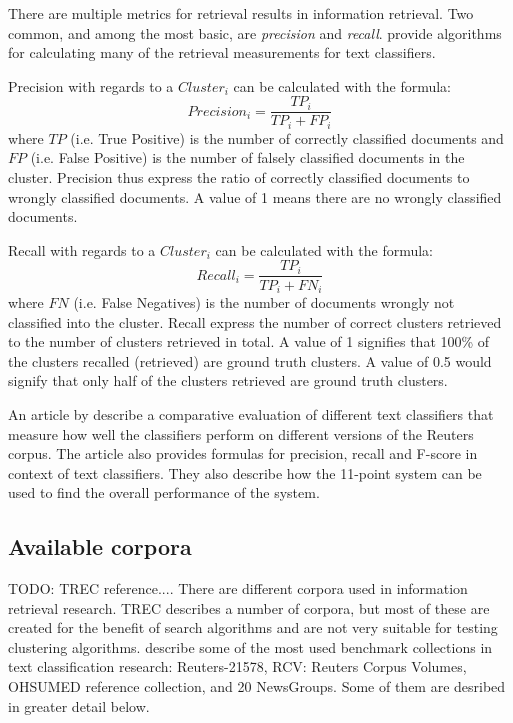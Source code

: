 There are multiple metrics for retrieval results in information retrieval. Two common, and among the most basic, are \textit{precision} and \textit{recall}. \cite{Sebastiani2002} provide algorithms for calculating many of the retrieval measurements for text classifiers.

Precision with regards to a \(Cluster_{i}\) can be calculated with the formula:
\begin{displaymath}
Precision_{i} = 
\frac{TP_{i}}{TP_{i} + FP_{i}}
\end{displaymath}
where \(TP\) (i.e. True Positive) is the number of correctly classified documents and \(FP\) (i.e. False Positive) is the number of falsely classified documents in the cluster. Precision thus express the ratio of correctly classified documents to wrongly classified documents. A value of 1 means there are no wrongly classified documents.

Recall with regards to a \(Cluster_{i}\) can be calculated with the formula: 
\begin{displaymath}
Recall_{i} = 
\frac{TP_{i}}{TP_{i} + FN_{i}}
\end{displaymath}
where \(FN\) (i.e. False Negatives) is the number of documents wrongly not classified into the cluster. Recall express the number of correct clusters retrieved to the number of clusters retrieved in total. A value of 1 signifies that 100\% of the clusters recalled (retrieved) are ground truth clusters. A value of 0.5 would signify that only half of the clusters retrieved are ground truth clusters.

An article by \cite{Yang1999} describe a comparative evaluation of different text classifiers that measure how well the classifiers perform on different versions of the Reuters corpus. The article also provides formulas for precision, recall and F-score in context of text classifiers. They also describe how the 11-point system can be used to find the overall performance of the system.


\subsection{Available corpora}
TODO: TREC reference....
There are different corpora used in information retrieval research. TREC describes a number of corpora, but most of these are created for the benefit of search algorithms and are not very suitable for testing clustering algorithms. \citeauthor{Baeza-Yates2011a} describe some of the most used benchmark collections in text classification research: Reuters-21578, RCV: Reuters Corpus Volumes, OHSUMED reference collection, and 20 NewsGroups. Some of them are desribed in greater detail below.

